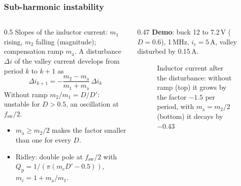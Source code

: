 \begin{frame}
	\frametitle{Sub-harmonic instability}
	\begin{columns}[T]
		\begin{column}{0.5\textwidth}
			\footnotesize
			Slopes of the inductor current: $m_1$ rising, $m_2$ falling (magnitude); compensation ramp $m_\mathrm{a}$. A disturbance $\Delta i$ of the valley current develops from period $k$ to $k+1$ as
			\begin{equation*}
				\Delta i_{k+1}=-\frac{m_2-m_\mathrm{a}}{m_1+m_\mathrm{a}}\,\Delta i_k
			\end{equation*}
			Without ramp $m_2/m_1=D/D'$: unstable for $D>0.5$, an oscillation at $f_\mathrm{sw}/2$.
			\begin{itemize}
				\item $m_\mathrm{a}\geq m_2/2$ makes the factor smaller than one for every $D$.
				\item Ridley: double pole at $f_\mathrm{sw}/2$ with $Q_\mathrm{p}=1/(\pi(m_\mathrm{c}D'-0.5))$, $m_\mathrm{c}=1+m_\mathrm{a}/m_1$.
			\end{itemize}
		\end{column}
		\begin{column}{0.47\textwidth}
			\footnotesize
			\textbf{Demo}: buck 12 to 7.2\,V ($D=0.6$), 1\,MHz, $i_\mathrm{c}=5$\,A, valley disturbed by 0.15\,A.
			\begin{figure}
				\centering
				\caption{Inductor current after the disturbance: without ramp (top) it grows by the factor $-1.5$ per period, with $m_\mathrm{a}=m_2/2$ (bottom) it decays by $-0.43$}
			\end{figure}
		\end{column}
	\end{columns}
\end{frame}

